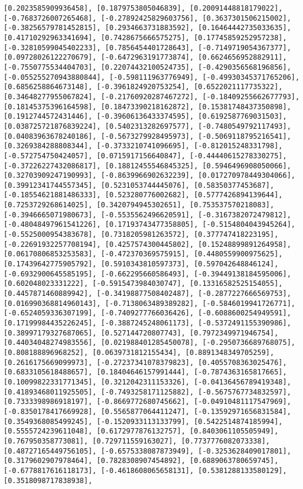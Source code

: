 \documentclass[11pt]{article}
\begin{document}
\begin{Verbatim}[commandchars=\\\{\}]
[0.2023585909936458], [0.1879753805046839], [0.20091448818179022], [-0.7683726007265468], [-0.27892425829603756], [0.3637301506215002], [-0.38256579781452815], [0.2934663731883592], [0.16464442735033635], [0.41710292963341694], [0.7428675666575275], [0.17745859252957238], [-0.32810599045402233], [0.7856454401728643], [-0.7149719054367377], [0.09728026122270679], [-0.6472963191773874], [0.6624656952882911], [-0.7550775534404703], [0.22074432100524735], [-0.4290356568196856], [-0.055255270943880844], [-0.598111963776949], [-0.49930345371765206], [0.6856258864673148], [-0.3961824920753254], [0.6522021117735322], [0.34648277955067824], [-0.21760920287467272], [-0.18409255662677793], [0.18145375396164598], [0.18473390218162872], [0.15381748437350898], [0.1912744572431446], [-0.39606136433374595], [0.6192587769031503], [0.038725721876839224], [0.5402313282697577], [-0.7480549792117493], [0.04083963678240186], [-0.5673279928495973], [-0.5069118795216541], [0.3269384288808344], [-0.3733210741096695], [-0.812015248331798], [-0.572754750424057], [0.0715917156640847], [-0.44440615278330275], [-0.37226227432086817], [0.18812455546845325], [0.5946496908050066], [0.32703909247190993], [-0.8639966902632239], [0.017270978449304066], [0.39912341744557345], [0.5231053744445076], [0.58350377453687], [-0.18554621881486333], [0.523280776002682], [0.5777426894139644], [0.7253729268614025], [0.3420794945302651], [0.753537570218083], [-0.3946665071980673], [-0.5535562496620591], [-0.3167382072479812], [-0.48048497961541226], [0.17193743477358805], [-0.5154804043945264], [-0.5525000954383678], [0.7318205981263572], [0.377747418223195], [-0.22691932257708194], [0.4257574300445802], [0.15248899891264958], [0.06170806853253583], [-0.472370369575915], [0.4480559900975625], [0.17439642775905792], [0.5910343810597373], [0.597042648846124], [-0.6932900645585195], [-0.662295660586493], [-0.39449138184595006], [0.602048023331222], [-0.5915473984030747], [0.13316582525154055], [0.4457871460889942], [-0.34198877508402487], [-0.2877227666569753], [0.016990368814960143], [-0.7138063489389282], [-0.5846019941726771], [-0.6524059336307199], [-0.7409277766036426], [-0.6088600254949591], [0.17199984435226245], [-0.3887245248061173], [-0.5372491155390986], [0.38997179327687065], [0.527144720807743], [0.7972349971946754], [0.44034048274983556], [0.021988401285450078], [-0.2950736689768075], [0.808188896968252], [0.0639731812155434], [0.8891348349705259], [0.2616175669099973], [-0.27237341078379823], [0.4055708363025476], [0.6833105618488657], [0.18404646157991444], [-0.7874363165817665], [0.10099822331771345], [0.3212042311153326], [-0.04136456789419348], [0.41893468011925505], [-0.7493258171125882], [-0.5675767734832597], [0.7333398986918197], [-0.8669772680745662], [-0.04910481117547969], [-0.8350178417669928], [0.5565877064411247], [-0.13592971656831584], [0.3549368085499245], [-0.1520933113133799], [0.5422514874185994], [0.5555724239611048], [0.6172977876132757], [0.8403061105505949], [0.767950358773081], [0.729711559163027], [0.7737776082073338], [0.48727165449756105], [-0.6575338087873949], [-0.3253628409017801], [0.3179602907978464], [0.7828308907454892], [0.6889063780659745], [-0.6778817616118173], [-0.4618608065658131], [0.5381288133580129], [0.3518098717838938], 
\end{Verbatim}
\end{document}
